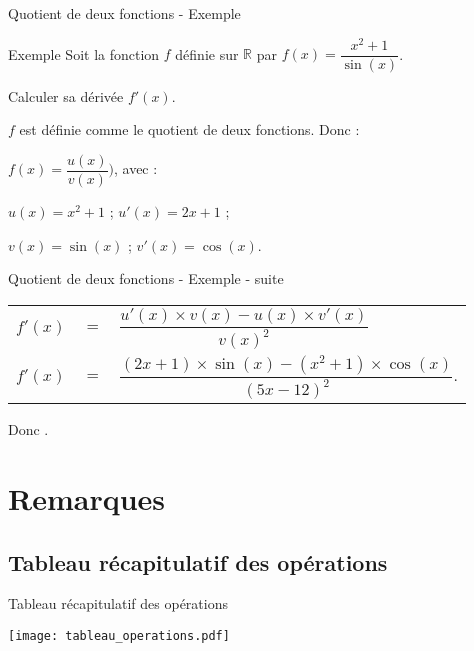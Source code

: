 \documentclass[12pt]{beamer}
\begin{document}
\begin{frame}{Quotient de deux fonctions - Exemple}
\begin{block}{Exemple}
Soit la fonction $f$ définie sur $\mathbb{R}$ par $f(x) = \dfrac{x^2+1}{\sin(x)}$. \par 
Calculer sa dérivée $f'(x)$.
\end{block}

\medskip

$f$ est définie comme le quotient de deux fonctions. Donc :

\medskip

$f(x) = \dfrac{u(x)}{v(x)})$, avec : 

\medskip

\begin{flushleft}
$u(x) = x^2+1$ ; \hspace{0.5cm} $u'(x) = 2x+1$ ; \par
$v(x) = \sin(x)$ ; \hspace{0.5cm} $v'(x) = \cos(x)$.
\end{flushleft}

\medskip

\end{frame}

\begin{frame}{Quotient de deux fonctions - Exemple - suite}
\begin{tabular}{rcl}
$f'(x)$ & $=$ & $\dfrac{u'(x) \times v(x) - u(x) \times v'(x)}{v(x)^2}$ \\
$f'(x)$ & $=$ & $\dfrac{(2x+1) \times \sin(x) - (x^2+1) \times \cos(x)}{(5x-12)^2}$.
\end{tabular}

\medskip

Donc .
\end{frame}

\section{Remarques}

\subsection{Tableau récapitulatif des opérations}

\begin{frame}{Tableau récapitulatif des opérations}
\begin{center}
\texttt{[image: tableau\_operations.pdf]}
\end{center}
\end{frame}
\end{document}
